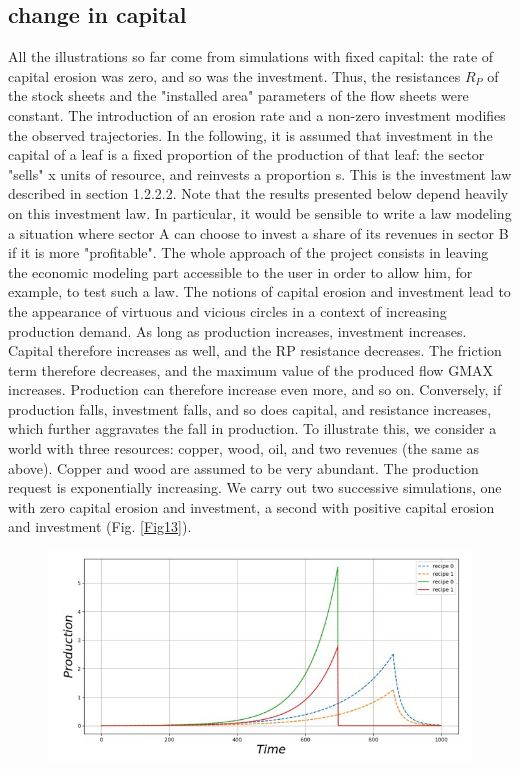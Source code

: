 \documentclass[12pt,a4paper]{article}%
\begin{document}
\begin{appendix}
\subsection{change in capital} 
All the illustrations so far come from simulations with fixed capital: the rate of capital erosion was zero, and so was the investment. Thus, the resistances $R_{P}$ of the stock sheets and the "installed area" parameters of the flow sheets were constant. The introduction of an erosion rate and a non-zero investment modifies the observed trajectories.  In the following, it is assumed that investment in the capital of a leaf is a fixed proportion of the production of that leaf: the sector "sells" x units of resource, and reinvests a proportion s. This is the investment law described in section 1.2.2.2. Note that the results presented below depend heavily on this investment law. In particular, it would be sensible to write a law modeling a situation where sector A can choose to invest a share of its revenues in sector B if it is more "profitable". The whole approach of the project consists in leaving the economic modeling part accessible to the user in order to allow him, for example, to test such a law.  The notions of capital erosion and investment lead to the appearance of virtuous and vicious circles in a context of increasing production demand.  As long as production increases, investment increases. Capital therefore increases as well, and the RP resistance decreases. The friction term therefore decreases, and the maximum value of the produced flow GMAX increases. Production can therefore increase even more, and so on.  Conversely, if production falls, investment falls, and so does capital, and resistance increases, which further aggravates the fall in production.  To illustrate this, we consider a world with three resources: copper, wood, oil, and two revenues (the same as above). Copper and wood are assumed to be very abundant. The production request is exponentially increasing. We carry out two successive simulations, one with zero capital erosion and investment, a second with positive capital erosion and investment (Fig. \ref{Fig13}).  
\begin{figure}[h] 
	\centering \includegraphics[width=1.0\textwidth]{figures/Production13.jpg}

\end{figure}
\end{appendix}
\end{document}
